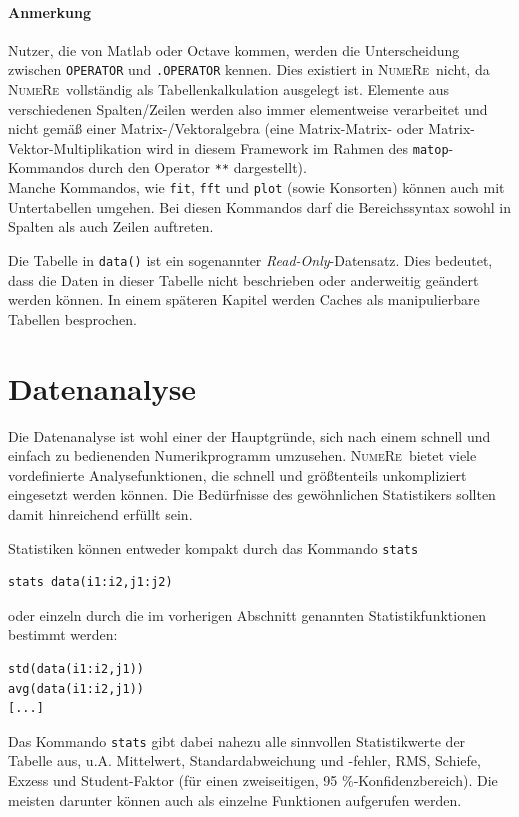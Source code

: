 \documentclass[DIV=14,headsepline,footsepline]{scrbook}
\newcommand{\NR}{\textsc{Nu\-me\-Re}}
\begin{document}
				\paragraph{Anmerkung}
					Nutzer, die von Matlab oder Octave kommen, werden die Unterscheidung zwischen \verb+OPERATOR+ und \verb+.OPERATOR+ kennen. Dies existiert in \NR\ nicht, da \NR\ vollständig als Tabellenkalkulation ausgelegt ist. Elemente aus verschiedenen Spalten/Zeilen werden also immer elementweise verarbeitet und nicht gemäß einer Matrix-/Vektoralgebra (eine Matrix-Matrix- oder Matrix-Vektor-Multiplikation wird in diesem Framework im Rahmen des \verb+matop+-Kommandos durch den Operator \verb+**+ dargestellt).\bigskip\\
				Manche Kommandos, wie \verb+fit+, \verb+fft+ und \verb+plot+ (sowie Konsorten) können auch mit Untertabellen umgehen. Bei diesen Kommandos darf die Bereichssyntax sowohl in Spalten als auch Zeilen auftreten.
				
				Die Tabelle in \verb+data()+ ist ein sogenannter \emph{Read-Only}-Datensatz. Dies bedeutet, dass die Daten in dieser Tabelle nicht beschrieben oder anderweitig geändert werden können. In einem späteren Kapitel werden Caches als manipulierbare Tabellen besprochen.
				
			\section{Datenanalyse}
				Die Datenanalyse ist wohl einer der Hauptgründe, sich nach einem schnell und einfach zu bedienenden Numerikprogramm umzusehen. \NR\ bietet viele vordefinierte Analysefunktionen, die schnell und größtenteils unkompliziert eingesetzt werden können. Die Bedürfnisse des gewöhnlichen Statistikers sollten damit hinreichend erfüllt sein.
				
				Statistiken können entweder kompakt durch das Kommando \verb+stats+
				\begin{lstlisting}
stats data(i1:i2,j1:j2)
				\end{lstlisting}
				oder einzeln durch die im vorherigen Abschnitt genannten Statistikfunktionen bestimmt werden:
				\begin{lstlisting}
std(data(i1:i2,j1))
avg(data(i1:i2,j1))
[...]
				\end{lstlisting}
				Das Kommando \verb+stats+ gibt dabei nahezu alle sinnvollen Statistikwerte der Tabelle aus, u.A. Mittelwert, Standardabweichung und -fehler, RMS, Schiefe, Exzess und Student-Faktor (für einen zweiseitigen, 95 \%-Konfidenzbereich). Die meisten darunter können auch als einzelne Funktionen aufgerufen werden.
				
\end{document}

